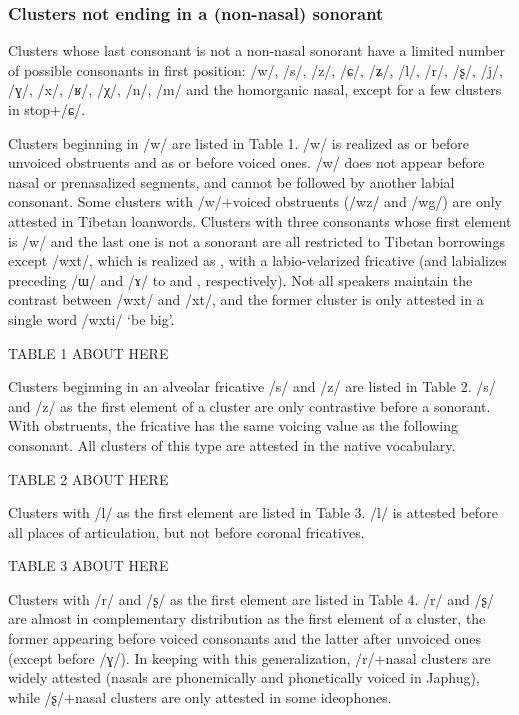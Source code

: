 \documentclass[12pt]{article}
\newcommand{\ipa}[1]{\mbox{\phon/#1/}}
\newcommand{\phonet}[1]{\mbox{\phon[#1]}}
\begin{document}
  \subsubsection*{Clusters not ending in a (non-nasal) sonorant}  
Clusters whose last consonant is not a non-nasal sonorant have a limited number of possible consonants in first position: \ipa{w}, \ipa{s}, \ipa{z}, \ipa{ɕ}, \ipa{ʑ}, \ipa{l}, \ipa{r}, \ipa{ʂ}, \ipa{j}, \ipa{ɣ}, \ipa{x}, \ipa{ʁ}, \ipa{χ}, \ipa{n}, \ipa{m} and the homorganic nasal, except for a few clusters in stop+\ipa{ɕ}.

 Clusters beginning in \ipa{w} are listed in Table 1.  \ipa{w} is realized as \phonet{f} or \phonet{ɸ} before unvoiced obstruents and as \phonet{v} or \phonet{β} before voiced ones. \ipa{w} does not appear before nasal or prenasalized segments, and cannot be followed by another labial consonant. Some clusters with \ipa{w}+voiced obstruents (\ipa{wz} and \ipa{wg}) are only attested in Tibetan loanwords. Clusters with three consonants whose first element is \ipa{w} and the last one is not a sonorant are all restricted to Tibetan borrowings except \ipa{wxt}, which is realized as \phonet{xʷt}, with a labio-velarized fricative (and labializes preceding \ipa{ɯ} and \ipa{ɤ} to \phonet{u} and \phonet{o}, respectively). Not all speakers maintain the contrast between \ipa{wxt} and \ipa{xt}, and the former cluster is only attested in a single word \ipa{wxti} `be big'.
 
TABLE 1 ABOUT HERE
  
 Clusters beginning in an alveolar fricative \ipa{s} and \ipa{z} are listed in Table 2.   \ipa{s} and \ipa{z} as the first element of a cluster are only contrastive before a sonorant. With obstruents, the fricative has the same voicing value as the following consonant. All clusters of this type are attested in the native vocabulary.


TABLE 2 ABOUT HERE
 
 Clusters with \ipa{l} as the first element are listed in Table 3.  \ipa{l} is attested before all places of articulation, but not before coronal fricatives.
 
TABLE 3 ABOUT HERE 
 
  Clusters with \ipa{r}  and \ipa{ʂ} as the first element are listed in Table 4. 
 \ipa{r} and \ipa{ʂ} are almost in complementary distribution as the first element of a cluster, the former appearing before voiced consonants and the latter after unvoiced ones (except before \ipa{ɣ}). In keeping with this generalization, \ipa{r}+nasal clusters are widely attested (nasals are phonemically and phonetically voiced in Japhug),  while \ipa{ʂ}+nasal clusters are only attested in some ideophones.
 
\end{document}
